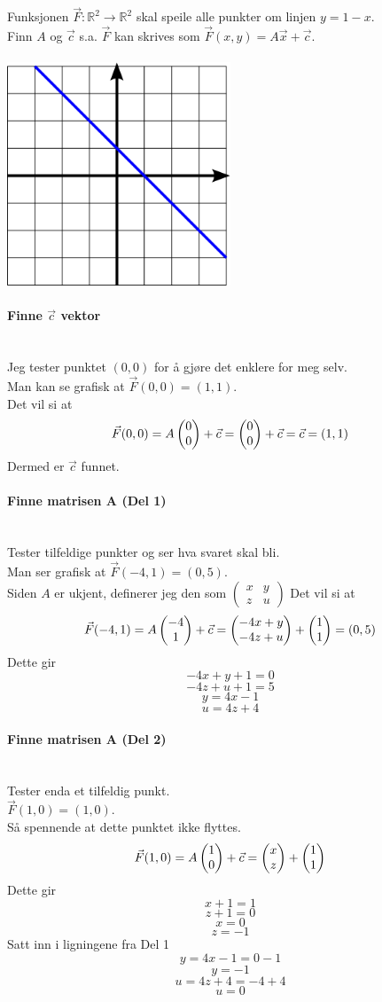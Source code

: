 Funksjonen $\vec{F}: \mathbb{R}^2 \to \mathbb{R}^2$
skal speile alle punkter om linjen $y = 1 - x$.\\
Finn $A$ og $\vec{c}$ s.a. $\vec{F}$ kan skrives som
$\vec{F}(x,y) = A\vec{x} + \vec{c}$.\\\\
\includegraphics[width=0.5\textwidth]{./mat1110-oblig1-oppg1.png}

\paragraph{Finne $\vec{c}$ vektor} \mbox{} \\
Jeg tester punktet $(0,0)$ for å gjøre det enklere for meg selv.\\
Man kan se grafisk at
$\vec{F}(0,0) = (1,1)$.\\
Det vil si at
$$\vec{F}(0,0) = A\colvec{0}{0}+\vec{c}
= \colvec{0}{0}+\vec{c} = \vec{c} = (1,1)$$
Dermed er $\vec{c}$ funnet.

\paragraph{Finne matrisen A (Del 1)} \mbox{} \\
Tester tilfeldige punkter og ser hva svaret skal bli.\\
Man ser grafisk at
$\vec{F}(-4,1) = (0,5)$.\\
Siden $A$ er ukjent, definerer jeg den som
$\left( \begin{matrix}
  x & y \\
  z & u
\end{matrix} \right)$
Det vil si at
$$\vec{F}(-4,1) = A\colvec{-4}{1}+\vec{c}
= \colvec{-4x+y}{-4z+u} + \colvec{1}{1} = (0,5)$$
Dette gir
$$-4x + y + 1 = 0 $$
$$-4z + u + 1 = 5$$
$$y = 4x - 1$$
$$u = 4z + 4$$

\paragraph{Finne matrisen A (Del 2)} \mbox{} \\
Tester enda et tilfeldig punkt.\\
$\vec{F}(1,0) = (1,0)$.\\
Så spennende at dette punktet ikke flyttes.\\
$$\vec{F}(1,0) = A\colvec{1}{0} + \vec{c}
= \colvec{x}{z} + \colvec{1}{1}$$
Dette gir
$$x+1=1$$
$$z+1=0$$
$$x = 0$$
$$z = -1$$
Satt inn i ligningene fra Del 1
$$y = 4x-1 = 0-1$$
$$y = -1$$
$$u = 4z+4 = -4+4$$
$$u = 0$$

